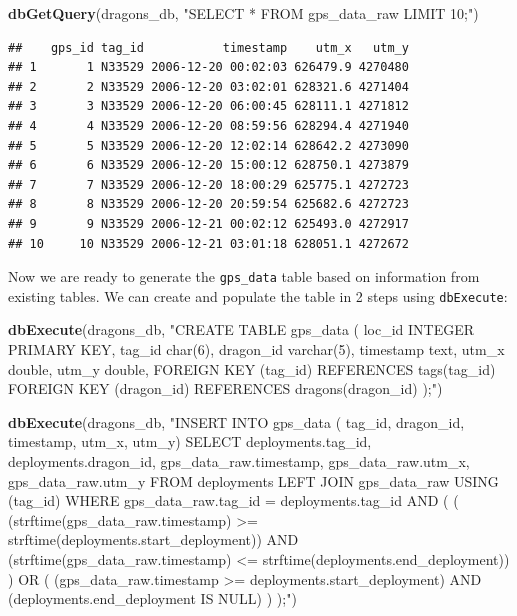 \documentclass[
]{book}
\newenvironment{Shaded}{\begin{snugshade}}{\end{snugshade}}
\newcommand{\FunctionTok}[1]{\textcolor[rgb]{0.13,0.29,0.53}{\textbf{#1}}}
\newcommand{\NormalTok}[1]{#1}
\newcommand{\StringTok}[1]{\textcolor[rgb]{0.31,0.60,0.02}{#1}}
\begin{document}
\begin{Shaded}
\begin{Highlighting}[]
\FunctionTok{dbGetQuery}\NormalTok{(dragons\_db, }\StringTok{"SELECT * FROM gps\_data\_raw LIMIT 10;"}\NormalTok{)}
\end{Highlighting}
\end{Shaded}

\begin{verbatim}
##    gps_id tag_id           timestamp    utm_x   utm_y
## 1       1 N33529 2006-12-20 00:02:03 626479.9 4270480
## 2       2 N33529 2006-12-20 03:02:01 628321.6 4271404
## 3       3 N33529 2006-12-20 06:00:45 628111.1 4271812
## 4       4 N33529 2006-12-20 08:59:56 628294.4 4271940
## 5       5 N33529 2006-12-20 12:02:14 628642.2 4273090
## 6       6 N33529 2006-12-20 15:00:12 628750.1 4273879
## 7       7 N33529 2006-12-20 18:00:29 625775.1 4272723
## 8       8 N33529 2006-12-20 20:59:54 625682.6 4272723
## 9       9 N33529 2006-12-21 00:02:12 625493.0 4272917
## 10     10 N33529 2006-12-21 03:01:18 628051.1 4272672
\end{verbatim}

Now we are ready to generate the \texttt{gps\_data} table based on information from
existing tables. We can create and populate the table in 2 steps using
\texttt{dbExecute}:

\begin{Shaded}
\begin{Highlighting}[]
\FunctionTok{dbExecute}\NormalTok{(dragons\_db, }\StringTok{"CREATE TABLE gps\_data (}
\StringTok{loc\_id INTEGER PRIMARY KEY,}
\StringTok{tag\_id char(6),}
\StringTok{dragon\_id varchar(5),}
\StringTok{timestamp text,}
\StringTok{utm\_x double,}
\StringTok{utm\_y double,}
\StringTok{FOREIGN KEY (tag\_id) REFERENCES tags(tag\_id)}
\StringTok{FOREIGN KEY (dragon\_id) REFERENCES dragons(dragon\_id)}
\StringTok{);"}\NormalTok{)}
\end{Highlighting}
\end{Shaded}

\begin{Shaded}
\begin{Highlighting}[]
\FunctionTok{dbExecute}\NormalTok{(dragons\_db, }\StringTok{"INSERT INTO gps\_data (}
\StringTok{tag\_id, dragon\_id, timestamp, utm\_x, utm\_y)}
\StringTok{SELECT}
\StringTok{deployments.tag\_id,}
\StringTok{deployments.dragon\_id,}
\StringTok{gps\_data\_raw.timestamp,}
\StringTok{gps\_data\_raw.utm\_x,}
\StringTok{gps\_data\_raw.utm\_y}
\StringTok{FROM deployments LEFT JOIN gps\_data\_raw USING (tag\_id)}
\StringTok{WHERE gps\_data\_raw.tag\_id = deployments.tag\_id AND}
\StringTok{(}
\StringTok{    (}
\StringTok{    (strftime(gps\_data\_raw.timestamp) \textgreater{}= strftime(deployments.start\_deployment)) AND}
\StringTok{    (strftime(gps\_data\_raw.timestamp) \textless{}= strftime(deployments.end\_deployment))}
\StringTok{    )}
\StringTok{OR }
\StringTok{    (}
\StringTok{    (gps\_data\_raw.timestamp \textgreater{}= deployments.start\_deployment) AND}
\StringTok{    (deployments.end\_deployment IS NULL)}
\StringTok{    )}
\StringTok{);"}\NormalTok{)}
\end{Highlighting}
\end{Shaded}
\end{document}
